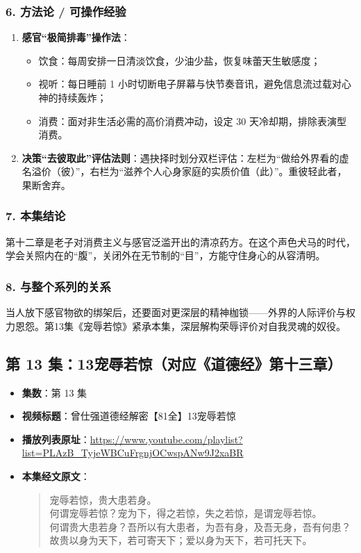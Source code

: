 \subsubsection{6. 方法论 / 可操作经验}
\begin{enumerate}
    \item \textbf{感官“极简排毒”操作法}：
    \begin{itemize}
        \item 饮食：每周安排一日清淡饮食，少油少盐，恢复味蕾天生敏感度；
        \item 视听：每日睡前 1 小时切断电子屏幕与快节奏音讯，避免信息流过载对心神的持续轰炸；
        \item 消费：面对非生活必需的高价消费冲动，设定 30 天冷却期，排除表演型消费。
    \end{itemize}
    \item \textbf{决策“去彼取此”评估法则}：遇抉择时划分双栏评估：左栏为“做给外界看的虚名溢价（彼）”，右栏为“滋养个人心身家庭的实质价值（此）”。重彼轻此者，果断舍弃。
\end{enumerate}

\subsubsection{7. 本集结论}
第十二章是老子对消费主义与感官泛滥开出的清凉药方。在这个声色犬马的时代，学会关照内在的“腹”，关闭外在无节制的“目”，方能守住身心的从容清明。

\subsubsection{8. 与整个系列的关系}
当人放下感官物欲的绑架后，还要面对更深层的精神枷锁——外界的人际评价与权力恩怨。第13集《宠辱若惊》紧承本集，深层解构荣辱评价对自我灵魂的奴役。

\clearpage

\subsection{第 13 集：13宠辱若惊（对应《道德经》第十三章）}
\label{sec:ep13}

\begin{itemize}
    \item \textbf{集数}：第 13 集
    \item \textbf{视频标题}：曾仕强道德经解密【81全】13宠辱若惊
    \item \textbf{播放列表原址}：\url{https://www.youtube.com/playlist?list=PLAzB_TyjeWBCuFrgnjOCwspANw9J2xaBR}
    \item \textbf{本集经文原文}：
    \begin{quote}\kaishu
    宠辱若惊，贵大患若身。\\
    何谓宠辱若惊？宠为下，得之若惊，失之若惊，是谓宠辱若惊。\\
    何谓贵大患若身？吾所以有大患者，为吾有身，及吾无身，吾有何患？\\
    故贵以身为天下，若可寄天下；爱以身为天下，若可托天下。
    \end{quote}
\end{itemize}

